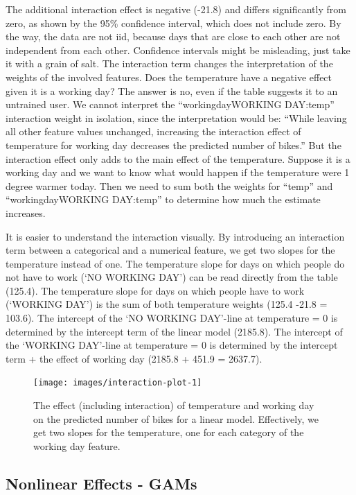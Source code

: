 \documentclass[
  12pt,
]{krantz}
\begin{document}
The additional interaction effect is negative (-21.8) and differs significantly from zero, as shown by the 95\% confidence interval, which does not include zero.
By the way, the data are not iid, because days that are close to each other are not independent from each other.
Confidence intervals might be misleading, just take it with a grain of salt.
The interaction term changes the interpretation of the weights of the involved features.
Does the temperature have a negative effect given it is a working day?
The answer is no, even if the table suggests it to an untrained user.
We cannot interpret the ``workingdayWORKING DAY:temp'' interaction weight in isolation, since the interpretation would be:
``While leaving all other feature values unchanged, increasing the interaction effect of temperature for working day decreases the predicted number of bikes.''
But the interaction effect only adds to the main effect of the temperature.
Suppose it is a working day and we want to know what would happen if the temperature were 1 degree warmer today.
Then we need to sum both the weights for ``temp'' and ``workingdayWORKING DAY:temp'' to determine how much the estimate increases.

It is easier to understand the interaction visually.
By introducing an interaction term between a categorical and a numerical feature, we get two slopes for the temperature instead of one.
The temperature slope for days on which people do not have to work (`NO WORKING DAY') can be read directly from the table (125.4).
The temperature slope for days on which people have to work (`WORKING DAY') is the sum of both temperature weights (125.4 -21.8 = 103.6).
The intercept of the `NO WORKING DAY'-line at temperature = 0 is determined by the intercept term of the linear model (2185.8).
The intercept of the `WORKING DAY'-line at temperature = 0 is determined by the intercept term + the effect of working day (2185.8 + 451.9 = 2637.7).

\begin{figure}

{\centering \texttt{[image: images/interaction-plot-1]} 

}

\caption{The effect (including interaction) of temperature and working day on the predicted number of bikes for a linear model. Effectively, we get two slopes for the temperature, one for each category of the working day feature.}\label{fig:interaction-plot}
\end{figure}

\hypertarget{gam}{%
\subsection{Nonlinear Effects - GAMs}\label{gam}}
\end{document}
